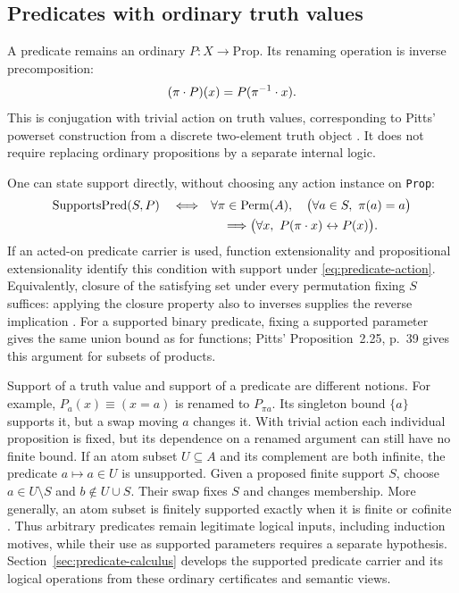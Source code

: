 \subsection{Predicates with ordinary truth values}
\label{sec:function-predicates}

A predicate remains an ordinary $P:X\to\mathrm{Prop}$. Its renaming
operation is inverse precomposition:
\begin{equation}
  (\pi\mathbin{\cdot} P)(x)=P(\pi^{-1}\mathbin{\cdot} x).
  \label{eq:predicate-action}
\end{equation}
This is conjugation with trivial action on truth values, corresponding
to Pitts' powerset construction from a discrete two-element truth object
\cite[Section~1.5, pp.~19--20]{pitts2013}. It does not require replacing
ordinary propositions by a separate internal logic.

One can state support directly, without choosing any action instance on
\texttt{Prop}:
\begin{equation}
\begin{split}
  \operatorname{SupportsPred}(S,P)\quad\Longleftrightarrow\quad
  &\forall\pi\in\operatorname{Perm}(A),\quad
  \bigl(\forall a\in S,\ \pi(a)=a\bigr)\\
  &\hspace{1em}\Longrightarrow
    \bigl(\forall x,\ P(\pi\mathbin{\cdot} x)\leftrightarrow P(x)\bigr).
\end{split}
\label{eq:supports-predicate}
\end{equation}
If an acted-on predicate carrier is used, function extensionality and
propositional extensionality identify this condition with support under
\eqref{eq:predicate-action}. Equivalently, closure of the satisfying set
under every permutation fixing $S$ suffices: applying the closure property
also to inverses supplies the reverse implication
\cite[Lemma~2.24, p.~39]{pitts2013}. For a supported binary predicate,
fixing a supported parameter gives the same union bound as for functions;
Pitts' Proposition~2.25, p.~39 gives this argument for subsets of products.

Support of a truth value and support of a predicate are different notions.
For example, $P_a(x)\equiv(x=a)$ is renamed to $P_{\pi a}$.
Its singleton bound $\{a\}$ supports it, but a swap moving $a$ changes it.
With trivial action each individual proposition is fixed, but its dependence
on a renamed argument can still have no finite bound. If an atom subset
$U\subseteq A$ and its complement are both infinite, the predicate
$a\mapsto a\in U$ is unsupported. Given a proposed finite support $S$,
choose $a\in U\setminus S$ and $b\notin U\cup S$. Their swap fixes $S$
and changes membership. More generally, an atom subset is finitely
supported exactly when it is finite or cofinite
\cite[Proposition~2.9, pp.~31--32]{pitts2013}. Thus arbitrary predicates
remain legitimate logical inputs, including induction motives, while their
use as supported parameters requires a separate hypothesis.
Section~\ref{sec:predicate-calculus} develops the supported predicate carrier
and its logical operations from these ordinary certificates and semantic views.

